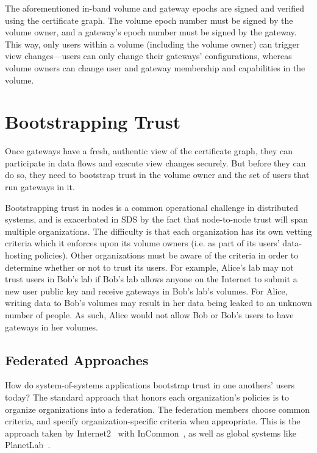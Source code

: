 The aforementioned in-band volume and gateway epochs are signed and
verified using the certificate graph.  The volume epoch number must be signed by
the volume owner, and a gateway's epoch number must be signed by the gateway.
This way, only users within a volume (including the volume owner) can trigger
view changes---users can only change their gateways' configurations, whereas volume
owners can change user and gateway membership and capabilities in the volume.

\section{Bootstrapping Trust}
\label{sec:bootstrapping-trust}

Once gateways have a fresh, authentic view of the certificate graph, they can
participate in data flows and execute view changes securely.  But before they
can do so, they need to bootstrap trust in the volume owner and the set of users
that run gateways in it.

Bootstrapping trust in nodes is a common operational challenge in
distributed systems, and is exacerbated in SDS by the fact that node-to-node
trust will span multiple organizations.
The difficulty is that each organization has its own vetting criteria which it
enforces upon its volume owners (i.e. as part of its users' data-hosting
policies).  Other organizations must be aware of the criteria in order to determine
whether or not to trust its users.  For example, Alice's lab may
not trust users in Bob's lab if Bob's lab allows anyone on the Internet
to submit a new user public key and receive gateways in Bob's
lab's volumes.  For Alice, writing data to Bob's volumes may result in her data
being leaked to an unknown number of people.  As such, Alice would not allow Bob
or Bob's users to have gateways in her volumes.

\subsection{Federated Approaches}

How do system-of-systems applications bootstrap trust in one anothers' users
today?  The standard approach that honors each organization's policies is to organize
organizations into a federation.  The federation members choose common criteria,
and specify organization-specific criteria when appropriate.  This is the
approach taken by Internet2~\cite{internet2} with InCommon~\cite{incommon}, as
well as global systems like PlanetLab~\cite{planet-lab}.

